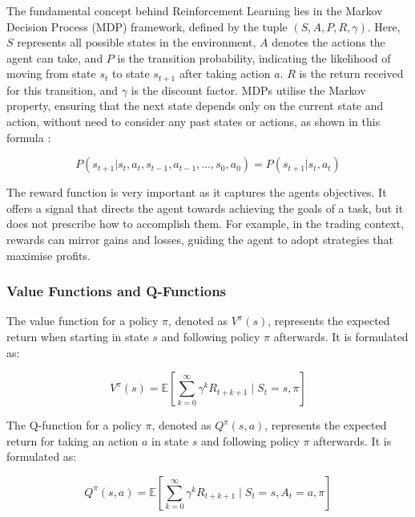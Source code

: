 The fundamental concept behind Reinforcement Learning lies in the Markov Decision Process (MDP) framework, defined by the tuple \( (S, A, P, R, \gamma) \). Here, \( S \) represents all possible states in the environment, \( A \) denotes the actions the agent can take, and \( P \) is the transition probability, indicating the likelihood of moving from state \( s_t \) to state \( s_{t+1} \) after taking action \( a \). \( R \) is the return received for this transition, and \( \gamma \) is the discount factor. MDPs utilise the Markov property, ensuring that the next state depends only on the current state and action, without need to consider any past states or actions, as shown in this formula \cite{sutton_reinforcement_2018}:

\begin{equation}
\label{Equation:MarkovProperty}
P(s_{t+1} | s_t, a_t, s_{t-1}, a_{t-1}, \ldots, s_0, a_0) = P(s_{t+1} | s_t, a_t)
\end{equation}

The reward function is very important as it captures the agents objectives. It offers a signal that directs the agent towards achieving the goals of a task, but it does not prescribe how to accomplish them. For example, in the trading context, rewards can mirror gains and losses, guiding the agent to adopt strategies that maximise profits.

\subsubsection{Value Functions and Q-Functions}

The value function for a policy \( \pi \), denoted as \( V^\pi(s) \), represents the expected return when starting in state \( s \) and following policy \( \pi \) afterwards. It is formulated as:

\begin{equation}
V^\pi(s) = \mathbb{E} \left[ \sum_{k=0}^{\infty} \gamma^k R_{t+k+1} \mid S_t = s, \pi \right]
\end{equation}

The Q-function for a policy \( \pi \), denoted as \( Q^\pi(s, a) \), represents the expected return for taking an action \( a \) in state \( s \) and following policy \( \pi \) afterwards. It is formulated as:

\begin{equation}
Q^\pi(s, a) = \mathbb{E} \left[ \sum_{k=0}^{\infty} \gamma^k R_{t+k+1} \mid S_t = s, A_t = a, \pi \right]
\end{equation}

